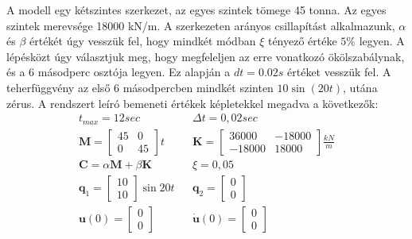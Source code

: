 A modell egy kétszintes szerkezet, az egyes szintek tömege 45 tonna. Az egyes szintek merevsége 18000 kN/m. A  szerkezeten arányos csillapítást alkalmazunk, $\alpha$ és $\beta$ értékét úgy vesszük fel, hogy mindkét módban $\xi$ tényező értéke $5\%$ legyen. A lépésközt úgy választjuk meg, hogy megfeleljen az erre vonatkozó ökölszabálynak, és a 6 másodperc osztója legyen. Ez alapján a $dt = 0.02 s$ értéket vesszük fel. A teherfüggvény  az első 6 másodpercben mindkét szinten $10\sin(20t)$, utána zérus. A rendszert leíró bemeneti értékek képletekkel megadva a következők:
  \begin{align*}
  & t_{max}  = 12 sec  & & \Delta{t} = 0,02 sec   & \\
  & \mathbf{M}  = \left[\begin{array}{rr}  45 & 0 \\ 0 & 45 \end{array} \right]t   &  & \mathbf{K} = \left[\begin{array}{rr} 36 000 & -18 000 \\ -18 000 & 18 000 \end{array} \right]\frac{kN}{m}  &  \\
  & \mathbf{C}  = \alpha\mathbf{M}+\beta\mathbf{K}  &  & \xi = 0,05  & \\
  & \mathbf{q}_1  = \left[\begin{array}{c} 10 \\ 10 \end{array} \right]\sin{20t}  & & \mathbf{q}_2 = \left[\begin{array}{c} 0 \\ 0 \end{array} \right]  & \\
  & \mathbf{u}(0)  = \left[\begin{array}{c} 0 \\ 0 \end{array} \right]  & & \mathbf{\dot{u}}(0) = \left[\begin{array}{c} 0 \\ 0 \end{array} \right] & 
  \end{align*}

